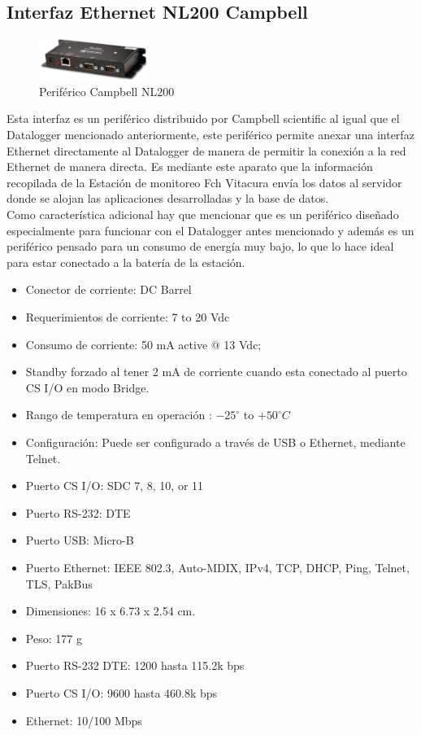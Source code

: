 \subsection{Interfaz Ethernet NL200 Campbell}

\begin{figure}[h!]
        \centering
        \includegraphics[width=100pt]{images/nl200}
        \caption{Periférico Campbell NL200} 
\end{figure}

Esta interfaz es un periférico distribuido por Campbell scientific al igual que el Datalogger mencionado anteriormente, este periférico permite anexar una interfaz Ethernet directamente al Datalogger de manera de permitir la conexión a la red Ethernet de manera directa. Es mediante este aparato que la información recopilada de la Estación de monitoreo Fch Vitacura envía los datos al servidor donde se alojan las aplicaciones desarrolladas y la base de datos.\\

Como característica adicional hay que mencionar que es un periférico diseñado especialmente para funcionar con el Datalogger antes mencionado y además es un periférico pensado para un consumo de energía muy bajo, lo que lo hace ideal para estar conectado a la batería de la estación.

\begin{itemize}
\item Conector de corriente: DC Barrel
\item Requerimientos de corriente: 7 to 20 Vdc 
\item Consumo de corriente: 50 mA active @ 13 Vdc;
\item Standby forzado al tener 2 mA de corriente cuando esta conectado al puerto CS I/O en modo Bridge.
\item Rango de temperatura en operación : ${-25}^{\circ}$ to ${+50}^{\circ}C$
\item Configuración: Puede ser configurado a través de USB o Ethernet, mediante Telnet.
\item Puerto CS I/O: SDC 7, 8, 10, or 11
\item Puerto RS-232: DTE
\item Puerto USB: Micro-B
\item Puerto Ethernet: IEEE 802.3, Auto-MDIX, IPv4, TCP, DHCP, Ping, Telnet, TLS, PakBus
\item Dimensiones: 16 x 6.73 x 2.54 cm.
\item Peso: 177 g
\item Puerto RS-232 DTE: 1200 hasta 115.2k bps
\item Puerto CS I/O: 9600 hasta 460.8k bps
\item Ethernet: 10/100 Mbps
\end{itemize}

